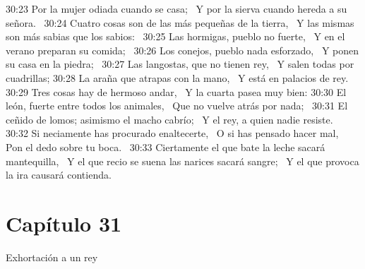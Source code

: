 30:23 Por la mujer odiada cuando se casa;  
Y por la sierva cuando hereda a su señora.  
30:24 Cuatro cosas son de las más pequeñas de la tierra,  
Y las mismas son más sabias que los sabios:  
30:25 Las hormigas, pueblo no fuerte,  
Y en el verano preparan su comida;  
30:26 Los conejos, pueblo nada esforzado,  
Y ponen su casa en la piedra;  
30:27 Las langostas, que no tienen rey,  
Y salen todas por cuadrillas; 
30:28 La araña que atrapas con la mano,  
Y está en palacios de rey.  
30:29 Tres cosas hay de hermoso andar,  
Y la cuarta pasea muy bien: 
30:30 El león, fuerte entre todos los animales,  
Que no vuelve atrás por nada;  
30:31 El ceñido de lomos; asimismo el macho cabrío;  
Y el rey, a quien nadie resiste.  
30:32 Si neciamente has procurado enaltecerte,  
O si has pensado hacer mal,  
Pon el dedo sobre tu boca.  
30:33 Ciertamente el que bate la leche sacará mantequilla,  
Y el que recio se suena las narices sacará sangre;  
Y el que provoca la ira causará contienda.  
\section*{Capítulo 31 }
Exhortación a un rey  

